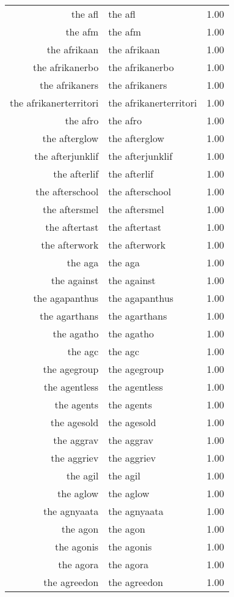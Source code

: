 \begin{table}[ht]
\begin{tabular}{rlr}
  the afl & the afl & 1.00 \\ 
  the afm & the afm & 1.00 \\ 
  the afrikaan & the afrikaan & 1.00 \\ 
  the afrikanerbo & the afrikanerbo & 1.00 \\ 
  the afrikaners & the afrikaners & 1.00 \\ 
  the afrikanerterritori & the afrikanerterritori & 1.00 \\ 
  the afro & the afro & 1.00 \\ 
  the afterglow & the afterglow & 1.00 \\ 
  the afterjunklif & the afterjunklif & 1.00 \\ 
  the afterlif & the afterlif & 1.00 \\ 
  the afterschool & the afterschool & 1.00 \\ 
  the aftersmel & the aftersmel & 1.00 \\ 
  the aftertast & the aftertast & 1.00 \\ 
  the afterwork & the afterwork & 1.00 \\ 
  the aga & the aga & 1.00 \\ 
  the against & the against & 1.00 \\ 
  the agapanthus & the agapanthus & 1.00 \\ 
  the agarthans & the agarthans & 1.00 \\ 
  the agatho & the agatho & 1.00 \\ 
  the agc & the agc & 1.00 \\ 
  the agegroup & the agegroup & 1.00 \\ 
  the agentless & the agentless & 1.00 \\ 
  the agents & the agents & 1.00 \\ 
  the agesold & the agesold & 1.00 \\ 
  the aggrav & the aggrav & 1.00 \\ 
  the aggriev & the aggriev & 1.00 \\ 
  the agil & the agil & 1.00 \\ 
  the aglow & the aglow & 1.00 \\ 
  the agnyaata & the agnyaata & 1.00 \\ 
  the agon & the agon & 1.00 \\ 
  the agonis & the agonis & 1.00 \\ 
  the agora & the agora & 1.00 \\ 
  the agreedon & the agreedon & 1.00 \\ 

\end{tabular}
\end{table}
